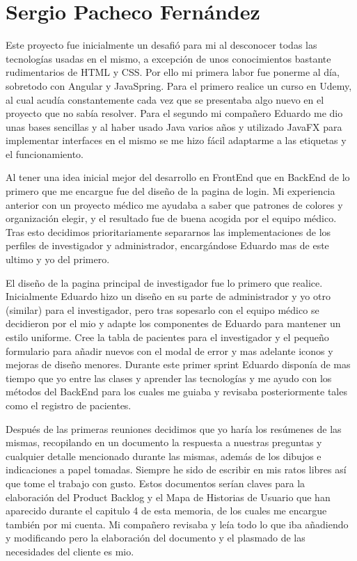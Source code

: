 \section{Sergio Pacheco Fernández}

Este proyecto fue inicialmente un desafió para mi al desconocer todas las tecnologías usadas en el mismo, a excepción de unos conocimientos bastante rudimentarios de HTML y CSS. Por ello mi primera labor fue ponerme al día, sobretodo con Angular y JavaSpring. Para el primero realice un curso en Udemy, al cual acudía constantemente cada vez que se presentaba algo nuevo en el proyecto que no sabía resolver. Para el segundo mi compañero Eduardo me dio unas bases sencillas y al haber usado Java varios años y utilizado JavaFX para implementar interfaces en el mismo se me hizo fácil adaptarme a las etiquetas y el funcionamiento.\newline

Al tener una idea inicial mejor del desarrollo en FrontEnd que en BackEnd de lo primero que me encargue fue del diseño de la pagina de login. Mi experiencia anterior con un proyecto médico me ayudaba a saber que patrones de colores y organización elegir, y el resultado fue de buena acogida por el equipo médico. Tras esto decidimos prioritariamente separarnos las implementaciones de los perfiles de investigador y administrador, encargándose Eduardo mas de este ultimo y yo del primero.\newline

El diseño de la pagina principal de investigador fue lo primero que realice. Inicialmente Eduardo hizo un diseño en su parte de administrador y yo otro (similar) para el investigador, pero tras sopesarlo con el equipo médico se decidieron por el mio y adapte los componentes de Eduardo para mantener un estilo uniforme. Cree la tabla de pacientes para el investigador y el pequeño formulario para añadir nuevos con el modal de error y mas adelante iconos y mejoras de diseño menores. Durante este primer sprint Eduardo disponía de mas tiempo que yo entre las clases y aprender las tecnologías y me ayudo con los métodos del BackEnd para los cuales me guiaba y revisaba posteriormente tales como el registro de pacientes.\newline

Después de las primeras reuniones decidimos que yo haría los resúmenes de las mismas, recopilando en un documento la respuesta a nuestras preguntas y cualquier detalle mencionado durante las mismas, además de los dibujos e indicaciones a papel tomadas. Siempre he sido de escribir en mis ratos libres así que tome el trabajo con gusto. Estos documentos serían claves para la elaboración del Product Backlog y el Mapa de Historias de Usuario que han aparecido durante el capitulo 4 de esta memoria, de los cuales me encargue también por mi cuenta. Mi compañero revisaba y leía todo lo que iba añadiendo y modificando pero la elaboración del documento y el plasmado de las necesidades del cliente es mio.\newline

